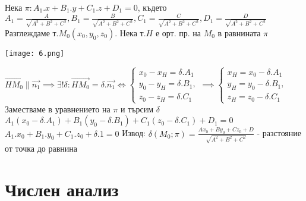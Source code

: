 \documentclass{article}
\begin{document}
Нека $\pi : A_1.x + B_1.y + C_1.z + D_1 = 0$, където $A_1 = \frac{A}{\sqrt{A^2 + B^2 + C^2}}, B_1 = \frac{B}{\sqrt{A^2 + B^2 +
C^2}}, C_1 = \frac{C}{\sqrt{A^2 + B^2 + C^2}}, D_1 = \frac{D}{\sqrt{A^2 + B^2 + C^2}}$ \newline\newline
Разглеждаме т.$M_0(x_0, y_0, z_0)$. Нека т.$H$ е орт. пр. на $M_0$ в равнината $\pi$ \newline
\begin{center}
    \texttt{[image: 6.png]}
\end{center}
$\vec{HM_0} \parallel \vec{n_1} \implies \exists! \delta : \vec{HM_0} = \delta . \vec{n_1} \iff \begin{cases}
    x_0 - x_H = \delta . A_1\\
    y_0 - y_H = \delta . B_1,\\
    z_0 - z_H = \delta . C_1
\end{cases} \implies \begin{cases}
    x_H = x_0 - \delta . A_1\\
    y_H = y_0 - \delta . B_1,\\
    z_H = z_0 - \delta . C_1
\end{cases}$ \newline
Заместваме в уравнението на $\pi$ и търсим $\delta$ \newline
$A_1(x_0 - \delta . A_1) + B_1(y_0 - \delta . B_1) + C_1(z_0 - \delta . C_1) + D_1 = 0$ \newline
$A_1.x_0 + B_1.y_0 + C_1.z_0 + \delta.1 = 0$ \newline
Извод: $\delta(M_0;\pi) = \frac{Ax_0 + By_0 + Cz_0 + D}{\sqrt{A^2 + B^2 + C^2}}$ - разстояние от точка до равнина 

\section*{Числен анализ}
\end{document}
